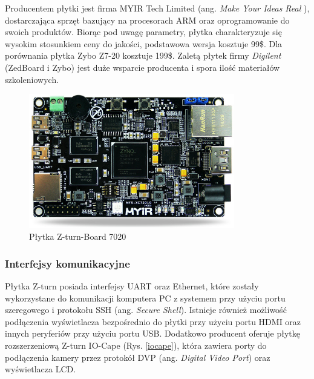 Producentem płytki jest firma MYIR Tech Limited (ang. \emph{Make Your Ideas Real} ), dostarczająca sprzęt bazujący na 
procesorach ARM oraz oprogramowanie do swoich produktów\cite{myir}. Biorąc pod uwagę parametry, płytka charakteryzuje się 
wysokim stosunkiem ceny do jakości, podstawowa wersja kosztuje 99\$. Dla porównania płytka Zybo Z7-20 kosztuje 199\$. Zaletą 
płytek firmy \emph{Digilent} (ZedBoard i Zybo) jest duże wsparcie producenta i spora ilość materiałów szkoleniowych.

\begin{figure}[h]
  \centering
  \includegraphics[width=0.8\textwidth]{img/zturn_board.jpg}
  \caption{Płytka Z-turn-Board 7020}
  \label{zturn_board}
\end{figure}


\subsubsection{Interfejsy komunikacyjne}

Płytka Z-turn posiada interfejsy UART oraz Ethernet, które zostały wykorzystane do komunikacji komputera PC z systemem przy 
użyciu portu szeregowego  
i protokołu SSH (ang. \emph{Secure Shell}). Istnieje również możliwość podłączenia wyświetlacza bezpośrednio do płytki przy 
użyciu portu HDMI oraz innych peryferiów przy użyciu portu USB. Dodatkowo producent oferuje płytkę rozszerzeniową Z-turn 
IO-Cape (Rys. \ref{iocape}), która zawiera porty do podłączenia kamery przez protokół DVP (ang. \emph{Digital Video Port}) 
oraz wyświetlacza LCD. 

